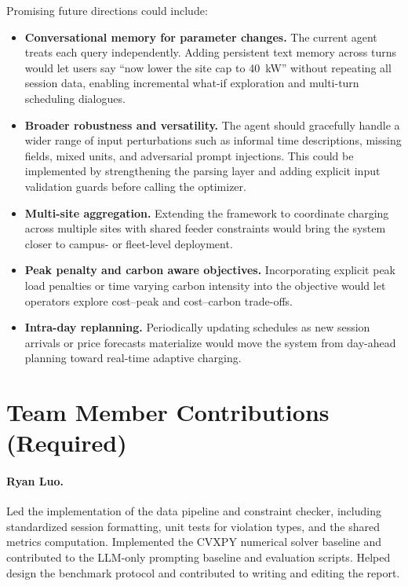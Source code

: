 \documentclass{article}
\begin{document}
Promising future directions could include:
\begin{itemize}
  \item \textbf{Conversational memory for parameter changes.} The current agent treats each query independently. Adding persistent text memory across turns would let users say ``now lower the site cap to 40~kW'' without repeating all session data, enabling incremental what-if exploration and multi-turn scheduling dialogues.
  \item \textbf{Broader robustness and versatility.} The agent should gracefully handle a wider range of input perturbations such as informal time descriptions, missing fields, mixed units, and adversarial prompt injections. This could be implemented by strengthening the parsing layer and adding explicit input validation guards before calling the optimizer.
  \item \textbf{Multi-site aggregation.} Extending the framework to coordinate charging across multiple sites with shared feeder constraints would bring the system closer to campus- or fleet-level deployment.
  \item \textbf{Peak penalty and carbon aware objectives.} Incorporating explicit peak load penalties or time varying carbon intensity into the objective would let operators explore cost--peak and cost--carbon trade-offs.
  \item \textbf{Intra-day replanning.} Periodically updating schedules as new session arrivals or price forecasts materialize would move the system from day-ahead planning toward real-time adaptive charging.
\end{itemize}

\clearpage
\section{Team Member Contributions (Required)}


\paragraph{Ryan Luo.}
Led the implementation of the data pipeline and constraint checker, including standardized session formatting, unit tests for violation types, and the shared metrics computation. Implemented the CVXPY numerical solver baseline and contributed to the LLM-only prompting baseline and evaluation scripts. Helped design the benchmark protocol and contributed to writing and editing the report.
\end{document}
